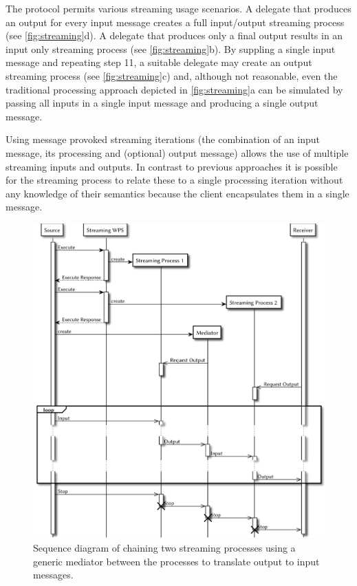     The protocol permits various streaming usage scenarios. A delegate that produces an output for every input message creates a full input/output streaming process (see \cref{fig:streaming}d). A delegate that produces only a final output results in an input only streaming process (see \cref{fig:streaming}b). By suppling a single input message and repeating step 11, a suitable delegate may create an output streaming process (see \cref{fig:streaming}c) and, although not reasonable, even the traditional processing approach depicted in \cref{fig:streaming}a can be simulated by passing all inputs in a single input message and producing a single output message.

    Using message provoked streaming iterations (the combination of an input message, its processing and (optional) output message) allows the use of multiple streaming inputs and outputs. In contrast to previous approaches it is possible for the streaming process to relate these to a single processing iteration without any knowledge of their semantics because the client encapsulates them in a single message.

    \begin{figure}[!htb]
      \centering
      \includegraphics[width=1\linewidth]{figures/sequence-diagramm-chain.pdf}
      \caption{\label{fig:sd:chain}Sequence diagram of chaining two streaming processes using a generic mediator between the processes to translate output to input messages.}
    \end{figure}

